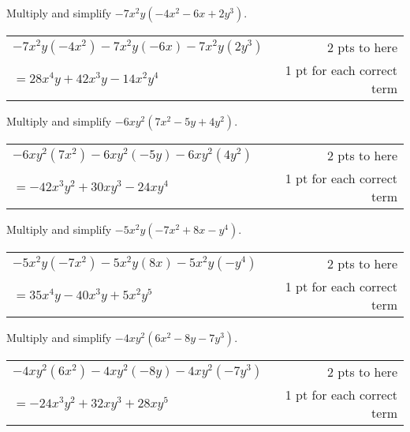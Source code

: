 {
	Multiply and simplify $-7x^2y(-4x^2-6x+2y^3)$.
}
{
	\begin{tabular}{l r}
	$-7x^2y(-4x^2)-7x^2y(-6x)-7x^2y(2y^3)$ & 2 pts to here\\
	$=28x^4y+42x^3y-14x^2y^4$ & 1 pt for each correct term
	\end{tabular}
}

{
	Multiply and simplify $-6xy^2(7x^2-5y+4y^2)$.
}
{
	\begin{tabular}{l r}
	$-6xy^2(7x^2)-6xy^2(-5y)-6xy^2(4y^2)$ & 2 pts to here\\
	$=-42x^3y^2+30xy^3-24xy^4$ & 1 pt for each correct term
	\end{tabular}
}
{
	Multiply and simplify $-5x^2y(-7x^2+8x-y^4)$.
}
{
	\begin{tabular}{l r}
	$-5x^2y(-7x^2)-5x^2y(8x)-5x^2y(-y^4)$ & 2 pts to here\\
	$=35x^4y-40x^3y+5x^2y^5$ & 1 pt for each correct term
	\end{tabular}
}
{
	Multiply and simplify $-4xy^2(6x^2-8y-7y^3).$
}
{
	\begin{tabular}{l r}
	$-4xy^2(6x^2)-4xy^2(-8y)-4xy^2(-7y^3)$ & 2 pts to here\\
	$=-24x^3y^2+32xy^3+28xy^5$ & 1 pt for each correct term
	\end{tabular}
}
